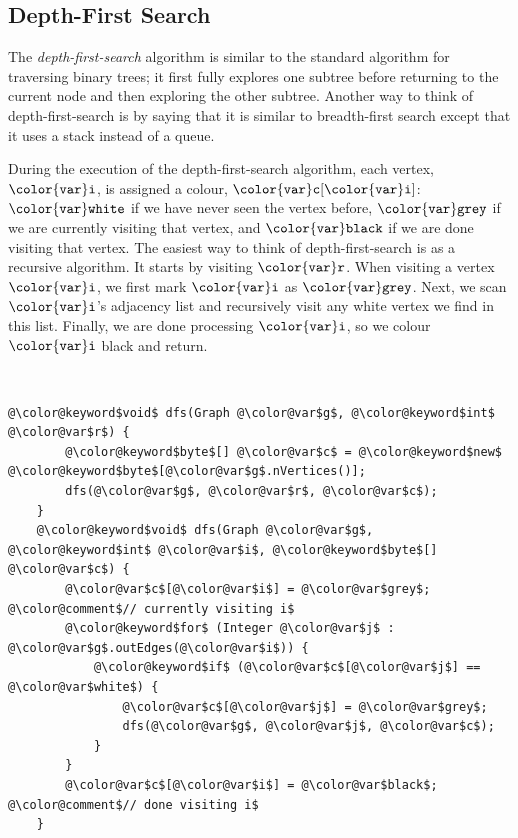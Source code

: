 \documentclass[10pt]{book}
\theoremstyle{plain}
\theoremstyle{definition}
\begin{document}
\subsection{Depth-First Search}

The \emph{depth-first-search}
%
algorithm is similar to the standard
algorithm for traversing binary trees;  it first fully explores one
subtree before returning to the current node and then exploring the
other subtree.  Another way to think of depth-first-search is by saying
that it is similar to breadth-first search except that it uses a stack
instead of a queue.

During the execution of the depth-first-search algorithm, each vertex,
\ensuremath{\mathtt{{\color{var}i}}}, is assigned a colour, \ensuremath{\mathtt{{\color{var}c}[{\color{var}i}]}}: \ensuremath{\mathtt{{\color{var}white}}} if we have never seen
the vertex before, \ensuremath{\mathtt{{\color{var}grey}}} if we are currently visiting that vertex,
and \ensuremath{\mathtt{{\color{var}black}}} if we are done visiting that vertex.  The easiest way to
think of depth-first-search is as a recursive algorithm.  It starts by
visiting \ensuremath{\mathtt{{\color{var}r}}}.  When visiting a vertex \ensuremath{\mathtt{{\color{var}i}}}, we first mark \ensuremath{\mathtt{{\color{var}i}}} as \ensuremath{\mathtt{{\color{var}grey}}}.
Next, we scan \ensuremath{\mathtt{{\color{var}i}}}'s adjacency list and recursively visit any white vertex
we find in this list.  Finally, we are done processing \ensuremath{\mathtt{{\color{var}i}}}, so we colour
\ensuremath{\mathtt{{\color{var}i}}} black and return.


 \ \vspace{.5ex}\begin{Verbatim}[gobble=1,tabsize=2,frame=single,framerule=1.2pt,commandchars=\\@\$,label=\texttt{Algorithms},labelposition=topline]
	@\color@keyword$void$ dfs(Graph @\color@var$g$, @\color@keyword$int$ @\color@var$r$) {
		@\color@keyword$byte$[] @\color@var$c$ = @\color@keyword$new$ @\color@keyword$byte$[@\color@var$g$.nVertices()];
		dfs(@\color@var$g$, @\color@var$r$, @\color@var$c$);
	}
	@\color@keyword$void$ dfs(Graph @\color@var$g$, @\color@keyword$int$ @\color@var$i$, @\color@keyword$byte$[] @\color@var$c$) {
		@\color@var$c$[@\color@var$i$] = @\color@var$grey$;  @\color@comment$// currently visiting i$
		@\color@keyword$for$ (Integer @\color@var$j$ : @\color@var$g$.outEdges(@\color@var$i$)) {
			@\color@keyword$if$ (@\color@var$c$[@\color@var$j$] == @\color@var$white$) {
				@\color@var$c$[@\color@var$j$] = @\color@var$grey$;
				dfs(@\color@var$g$, @\color@var$j$, @\color@var$c$);
			} 
		}
		@\color@var$c$[@\color@var$i$] = @\color@var$black$; @\color@comment$// done visiting i$
	}
\end{Verbatim}
\end{document}
